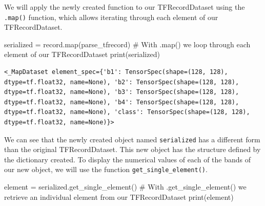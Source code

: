 \documentclass[
  letterpaper,
  DIV=11,
  numbers=noendperiod]{scrreprt}
\newenvironment{Shaded}{\begin{snugshade}}{\end{snugshade}}
\newcommand{\BuiltInTok}[1]{\textcolor[rgb]{0.00,0.23,0.31}{#1}}
\newcommand{\CommentTok}[1]{\textcolor[rgb]{0.37,0.37,0.37}{#1}}
\newcommand{\NormalTok}[1]{\textcolor[rgb]{0.00,0.23,0.31}{#1}}
\newcommand{\OperatorTok}[1]{\textcolor[rgb]{0.37,0.37,0.37}{#1}}
\begin{document}
We will apply the newly created function to our TFRecordDataset using
the \texttt{.map()} function, which allows iterating through each
element of our TFRecordDataset.

\begin{Shaded}
\begin{Highlighting}[]
\NormalTok{serialized }\OperatorTok{=}\NormalTok{ record.}\BuiltInTok{map}\NormalTok{(parse\_tfrecord) }\CommentTok{\# With .map() we loop through each element of our TFRecordDataset}
\BuiltInTok{print}\NormalTok{(serialized)}
\end{Highlighting}
\end{Shaded}

\begin{verbatim}
<_MapDataset element_spec={'b1': TensorSpec(shape=(128, 128), dtype=tf.float32, name=None), 'b2': TensorSpec(shape=(128, 128), dtype=tf.float32, name=None), 'b3': TensorSpec(shape=(128, 128), dtype=tf.float32, name=None), 'b4': TensorSpec(shape=(128, 128), dtype=tf.float32, name=None), 'class': TensorSpec(shape=(128, 128), dtype=tf.float32, name=None)}>
\end{verbatim}

We can see that the newly created object named \texttt{serialized} has a
different form than the original TFRecordDataset. This new object has
the structure defined by the dictionary created. To display the
numerical values of each of the bands of our new object, we will use the
function \texttt{get\_single\_element()}.

\begin{Shaded}
\begin{Highlighting}[]
\NormalTok{element }\OperatorTok{=}\NormalTok{ serialized.get\_single\_element() }\CommentTok{\# With .get\_single\_element() we retrieve an individual element from our TFRecordDataset}
\BuiltInTok{print}\NormalTok{(element)}
\end{Highlighting}
\end{Shaded}
\end{document}
